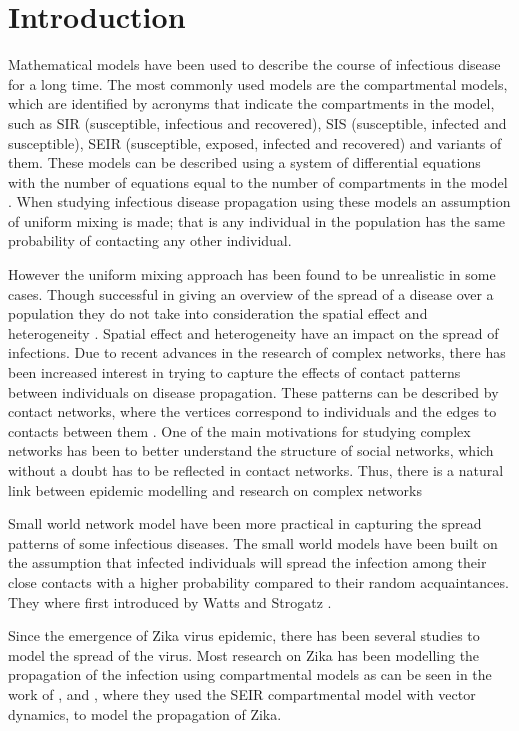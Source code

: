 \chapter{Introduction}
Mathematical models have been used to describe the course of infectious disease for a long time. The most commonly used
models are the compartmental models, which are identified by acronyms that indicate the compartments in the model, such as SIR (susceptible, infectious and recovered), SIS (susceptible, infected and susceptible),
SEIR  (susceptible, exposed, infected and recovered) and variants of them. These models can be described using a system of differential equations with the number of equations equal to the number of compartments in the model \citep{cheng2011small}.
When studying infectious disease propagation using these models an assumption of uniform mixing is made; that is any individual in the population has the same probability of contacting any other individual.
 
However the uniform mixing approach has been found to be unrealistic in some cases. Though successful in giving an overview of the spread of a disease over a population they do not take into consideration the spatial effect and heterogeneity \citep{andersson1999epidemic}. Spatial effect and heterogeneity have an impact on the spread of infections. Due to recent advances in the research of complex networks, there has been increased interest in trying to capture the effects of contact patterns between individuals on disease propagation. These patterns can be described by contact networks, where the vertices correspond to individuals and the edges to contacts between them  \citep{wallinga1999perspective}. One of the main motivations for studying complex networks has been to better understand the structure of social networks, which without a doubt has to be reflected in contact networks. Thus, there is a natural link between epidemic modelling and research on complex networks \citep{kaski2005modeling}
 
Small world network  model have been more practical in capturing the spread patterns of some infectious diseases. The small world models have been built on the assumption that infected individuals will spread the infection among their close contacts with a higher probability compared to their random acquaintances. They where first introduced by Watts and Strogatz \citep{watts1998collective}.
 
Since the emergence of Zika virus epidemic, there has been several studies to model the spread of the virus. Most research on Zika has been modelling the propagation of the infection
using compartmental models as can be seen in the work of \cite{1}, \cite{2} and \cite{3}, where they used the SEIR compartmental model with vector dynamics, to model the propagation of Zika. 

